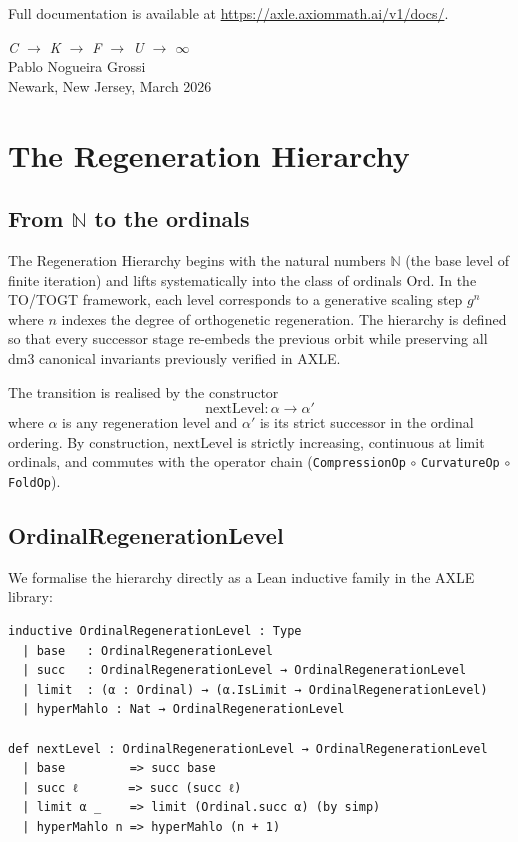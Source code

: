 Full documentation is available at \url{https://axle.axiommath.ai/v1/docs/}.

\bigskip
\begin{flushright}
\textit{C \;$\to$\; K \;$\to$\; F \;$\to$\; U \;$\to$\; $\infty$}\\[0.3em]
Pablo Nogueira Grossi\\
Newark, New Jersey, March 2026
\end{flushright}

\chapter{The Regeneration Hierarchy}

\section{From \(\mathbb{N}\) to the ordinals}

The Regeneration Hierarchy begins with the natural numbers \(\mathbb{N}\) (the base level of finite iteration) and lifts systematically into the class of ordinals \(\mathrm{Ord}\). In the TO/TOGT framework, each level corresponds to a generative scaling step \(g^n\) where \(n\) indexes the degree of orthogenetic regeneration. The hierarchy is defined so that every successor stage re-embeds the previous orbit while preserving all dm3 canonical invariants previously verified in AXLE.

The transition is realised by the constructor
\[
\text{nextLevel} : \alpha \to \alpha'
\]
where \(\alpha\) is any regeneration level and \(\alpha'\) is its strict successor in the ordinal ordering. By construction, \(\text{nextLevel}\) is strictly increasing, continuous at limit ordinals, and commutes with the operator chain (\texttt{CompressionOp} $\circ$ \texttt{CurvatureOp} $\circ$ \texttt{FoldOp}).

\section{OrdinalRegenerationLevel}

We formalise the hierarchy directly as a Lean inductive family in the AXLE library:

\begin{lstlisting}[language=Lean,caption={OrdinalRegenerationLevel in AXLE/TOGT}]
inductive OrdinalRegenerationLevel : Type
  | base   : OrdinalRegenerationLevel
  | succ   : OrdinalRegenerationLevel → OrdinalRegenerationLevel
  | limit  : (α : Ordinal) → (α.IsLimit → OrdinalRegenerationLevel)
  | hyperMahlo : Nat → OrdinalRegenerationLevel

def nextLevel : OrdinalRegenerationLevel → OrdinalRegenerationLevel
  | base         => succ base
  | succ ℓ       => succ (succ ℓ)
  | limit α _    => limit (Ordinal.succ α) (by simp)
  | hyperMahlo n => hyperMahlo (n + 1)
\end{lstlisting}

